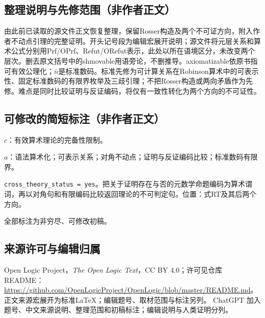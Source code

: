 \documentclass[UTF8,11pt]{ctexart}
\theoremstyle{definition}
\begin{document}
\subsection*{整理说明与先修范围（非作者正文）}
由此前已读取的源文件正文恢复整理，保留Rosser构造及两个不可证方向，附入作者不动点引理的完整证明。开头记号段为编辑宏展开说明；源文件将元层关系和算术公式分别用Prf/OPrf、Refut/ORefut表示，此处以所在语境区分，未改变两个层次。删去原文括号中的shmovable用语旁论，不删推导。axiomatizable依原书指可有效公理化；$\bar n$是标准数码。标准先修为可计算关系在Robinson算术中的可表示性、固定标准数码的有限界枚举及三歧引理；不把Rosser构造或两向矛盾作为先修。难点是同时比较证明与反证编码，将仅有一致性转化为两个方向的不可证性。
\subsection*{可修改的简短标注（非作者正文）}
$c$：有效算术理论的完备性限制。

$a$：语法算术化；可表示关系；对角不动点；证明与反证编码比较；标准数码有限界。

\texttt{cross\_theory\_status = yes}。把关于证明存在与否的元数学命题编码为算术谓词，再以对角句和有限编码比较返回理论的不可判定句。位置：式RT及其后两个方向。

全部标注为非穷尽、可修改初稿。
\subsection*{来源许可与编辑归属}
Open Logic Project，\emph{The Open Logic Text}，CC BY 4.0；许可见仓库README：\url{https://github.com/OpenLogicProject/OpenLogic/blob/master/README.md}。正文来源宏展开为标准LaTeX；编辑题号、取材范围与标注另列。
ChatGPT 加入题号、中文来源说明、整理范围和初稿标注；编辑说明与人类证明分列。
\end{document}
